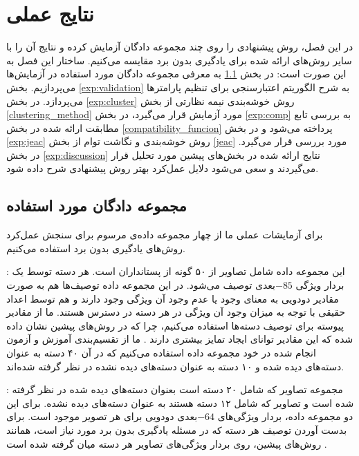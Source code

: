 \chapter{نتایج عملی} \label{chap:experiments}
در این فصل، روش پیشنهادی را روی چند مجموعه دادگان آزمایش کرده و نتایج آن را با سایر روش‌های ارائه شده برای یادگیری بدون برد مقایسه می‌کنیم. ساختار این فصل به این صورت است:
 در بخش \ref{exp:datasets} به معرفی مجموعه دادگان مورد استفاده در آزمایش‌ها می‌پردازیم.
بخش \ref{exp:validation} به شرح الگوریتم اعتبارسنجی برای تنظیم پارامترها می‌پردازد.
 در بخش \ref{exp:cluster} روش خوشه‌بندی نیمه نظارتی از بخش \ref{clustering_method} مورد آزمایش قرار می‌گیرد،
  در بخش \ref{exp:comp} به بررسی تابع مطابقت ارائه شده  در بخش \ref{compatibility_funcion} پرداخته می‌شود
   و در بخش \ref{exp:jeac} روش خوشه‌بندی و نگاشت توام از بخش \ref{jeac} مورد بررسی قرار می‌گیرد.
    در بخش \ref{exp:discussion} نتایج ارائه شده در بخش‌های پیشین مورد تحلیل قرار می‌گیردند و سعی می‌شود دلایل عمل‌کرد بهتر روش پیشنهادی شرح داده شود.


\section{مجموعه دادگان مورد استفاده}\label{exp:datasets}
برای آزمایشات عملی ما از چهار مجموعه داده‌ی مرسوم برای سنجش عمل‌کرد روش‌های یادگیری بدون برد استفاده می‌کنیم.

\textbf{} \cite{lampert09}:
این مجموعه داده شامل تصاویر از ۵۰ گونه از پستانداران است. هر دسته توسط یک بردار ویژگی $-85$بعدی توصیف می‌شود. در این مجموعه داده توصیف‌ها هم به صورت مقادیر دودویی به معنای وجود یا عدم وجود آن ویژگی وجود دارند و هم توسط اعداد حقیقی با توجه به میزان وجود آن ویژگی در هر دسته در دسترس هستند. ما از مقادیر پیوسته برای توصیف دسته‌ها استفاده می‌کنیم، چرا که در روش‌های پیشین نشان داده شده که این مقادیر توانای ایجاد تمایز بیشتری دارند \cite{Akata2015}. ما از تقسیم‌بندی آموزش و آزمون انجام شده در خود مجموعه داده استفاده می‌کنیم که در آن ۴۰ دسته به عنوان دسته‌های دیده شده و ۱۰ دسته به عنوان
دسته‌های دیده نشده در نظر گرفته شده‌اند.

\textbf{}\cite{farhadi09}:
مجموعه تصاویر
  \cite{pascal}
 که شامل ۲۰ دسته است بعنوان دسته‌های دیده شده در نظر گرفته شده است و تصاویر  که شامل ۱۲ دسته هستند به عنوان دسته‌های دیده نشده. برای این دو مجموعه داده، بردار ویژگی‌های $-64$بعدی دودویی برای هر تصویر موجود است. برای بدست آوردن توصیف هر دسته که در مسئله یادگیری بدون برد مورد نیاز است، همانند روش‌های پیشین، روی بردار ویژگی‌های تصاویر هر دسته میان گرفته
 شده است  \cite{lampert09}.


